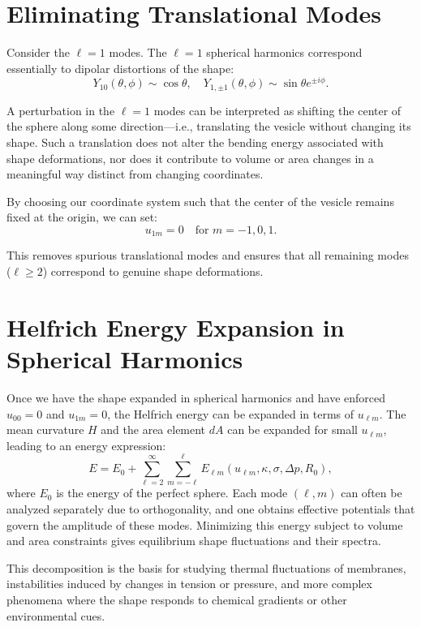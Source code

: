 \documentclass[12pt,a4paper]{article}
\begin{document}
\section{Eliminating Translational Modes}

Consider the $\ell=1$ modes. The $\ell=1$ spherical harmonics correspond essentially to dipolar distortions of the shape:
\[
Y_{10}(\theta,\phi) \sim \cos\theta, \quad Y_{1,\pm 1}(\theta,\phi) \sim \sin\theta e^{\pm i\phi}.
\]

A perturbation in the $\ell=1$ modes can be interpreted as shifting the center of the sphere along some direction—i.e., translating the vesicle without changing its shape. Such a translation does not alter the bending energy associated with shape deformations, nor does it contribute to volume or area changes in a meaningful way distinct from changing coordinates.

By choosing our coordinate system such that the center of the vesicle remains fixed at the origin, we can set:
\begin{equation}
u_{1m}=0 \quad \text{for } m=-1,0,1.
\end{equation}

This removes spurious translational modes and ensures that all remaining modes ($\ell\geq2$) correspond to genuine shape deformations.

\section{Helfrich Energy Expansion in Spherical Harmonics}

Once we have the shape expanded in spherical harmonics and have enforced $u_{00}=0$ and $u_{1m}=0$, the Helfrich energy can be expanded in terms of $u_{\ell m}$. The mean curvature $H$ and the area element $dA$ can be expanded for small $u_{\ell m}$, leading to an energy expression:
\begin{equation}
E = E_0 + \sum_{\ell=2}^{\infty}\sum_{m=-\ell}^{\ell} E_{\ell m}(u_{\ell m}, \kappa, \sigma, \Delta p, R_0),
\end{equation}
where $E_0$ is the energy of the perfect sphere. Each mode $(\ell,m)$ can often be analyzed separately due to orthogonality, and one obtains effective potentials that govern the amplitude of these modes. Minimizing this energy subject to volume and area constraints gives equilibrium shape fluctuations and their spectra.

This decomposition is the basis for studying thermal fluctuations of membranes, instabilities induced by changes in tension or pressure, and more complex phenomena where the shape responds to chemical gradients or other environmental cues.
\end{document}
